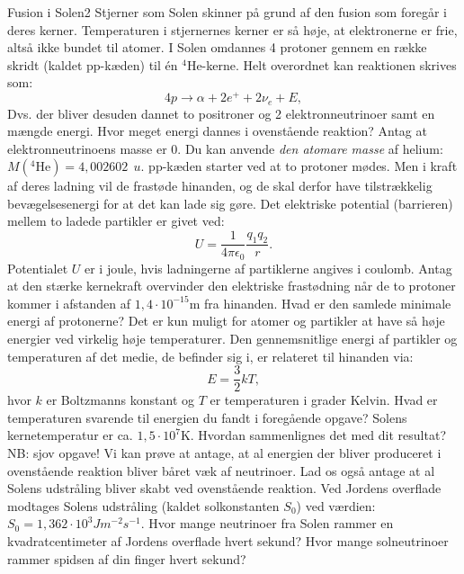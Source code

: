 \begin{opgave}{Fusion i Solen}{2}
Stjerner som Solen skinner på grund af den fusion som foregår i deres kerner. Temperaturen i stjernernes kerner er så høje, at elektronerne er frie, altså ikke bundet til atomer. I Solen omdannes 4 protoner gennem en række skridt (kaldet pp-kæden) til én $^{4}\text{He}$-kerne. Helt overordnet kan reaktionen skrives som:
\begin{equation*}
4p \rightarrow \alpha + 2e^+ + 2\nu_e + E,
\end{equation*}
Dvs. der bliver desuden dannet to positroner og 2 elektronneutrinoer samt en mængde energi.
\opg Hvor meget energi dannes i ovenstående reaktion? Antag at elektronneutrinoens masse er 0. Du kan anvende \emph{ den atomare masse} af helium: $M(^4\text{He})= 4,002602~\SI{}{u}$.
\opg pp-kæden starter ved at to protoner mødes. Men i kraft af deres ladning vil de frastøde hinanden, og de skal derfor have tilstrækkelig bevægelsesenergi for at det kan lade sig gøre. Det elektriske potential (barrieren) mellem to ladede partikler er givet ved:
\begin{equation}
U = \frac{1}{4\pi \epsilon_0} \frac{q_1q_2}{r}.
\end{equation}
Potentialet $U$ er i joule, hvis ladningerne af partiklerne angives i coulomb.
Antag at den stærke kernekraft overvinder den elektriske frastødning når de to protoner kommer i afstanden af $1,4 \cdot 10^{-15}$m fra hinanden. Hvad er den samlede minimale energi af protonerne?
\opg Det er kun muligt for atomer og partikler at have så høje energier ved virkelig høje temperaturer. Den gennemsnitlige energi af partikler og temperaturen af det medie, de befinder sig i, er relateret til hinanden via:
\begin{equation}
E = \frac{3}{2} k T,
\end{equation}
hvor $k$ er Boltzmanns konstant og $T$ er temperaturen i grader Kelvin. Hvad er temperaturen svarende til energien du fandt i foregående opgave? Solens kernetemperatur er ca. $1,5 \cdot 10^7$K. Hvordan sammenlignes det med dit resultat?
\opg NB: sjov opgave!
Vi kan prøve at antage, at al energien der bliver produceret i ovenstående reaktion bliver båret væk af neutrinoer. Lad os også antage at al Solens udstråling bliver skabt ved ovenstående reaktion. Ved Jordens overflade modtages Solens udstråling (kaldet solkonstanten $S_0$) ved værdien: $S_0 = 1,362 \cdot 10^3 J m^{-2}s^{-1}$. Hvor mange neutrinoer fra Solen rammer en kvadratcentimeter af Jordens overflade hvert sekund? Hvor mange solneutrinoer rammer spidsen af din finger hvert sekund?
\end{opgave}

